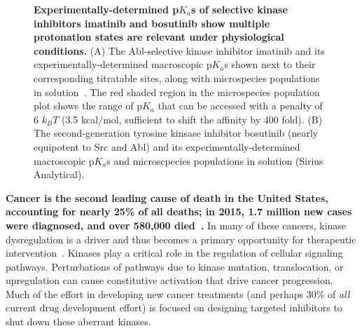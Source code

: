 \documentclass[11pt]{article}
\begin{document}
\begin{figure}[b]
\begin{centering}

\end{centering}
\vspace{-0.1in}
\caption{\footnotesize {\bf Experimentally-determined p$K_a$s of selective kinase inhibitors imatinib and bosutinib show multiple protonation states are relevant under physiological conditions.}
(A) The Abl-selective kinase inhibitor imatinib and its experimentally-determined macroscopic p$K_a$s shown next to their corresponding titratable sites, along with microspecies populations in solution~\cite{szakacks:j-med-chem:2005:acid-base-profiling-of-imatinib}.
The red shaded region in the microspecies population plot shows the range of p$K_a$ that can be accessed with a penalty of  6 $k_B T$ (3.5 kcal/mol, sufficient to shift the affinity by 400 fold).
(B) The second-generation tyrosine kinsase inhibitor bosutinib (nearly equipotent to Src and Abl) and its experimentally-determined macroscopic p$K_a$s and microscpecies populations in solution (Sirius Analytical).
\vspace{-0.1in}
\label{figure:kinase-inhibitor-experimental-pKas}}
\end{figure}

{\bf Cancer is the second leading cause of death in the United States, accounting for nearly 25\% of all deaths; in 2015, 1.7 million new cases were diagnosed, and over 580,000 died~\cite{acs-cancer-facts-2014}.}
In many of these cancers, kinase dysregulation is a driver and thus becomes a primary opportunity for therapeutic intervention~\cite{gray:nat-rev-cancer:2009:kinase-inhibitor-review}.
Kinases play a critical role in the regulation of cellular signaling pathways. Perturbations of pathways due to kinase mutation, translocation, or upregulation  can cause constitutive activation that drive cancer progression.
Much of the effort in developing new cancer treatments (and perhaps 30\% of \emph{all} current drug development effort) is focused on designing targeted inhibitors to shut down these aberrant kinases.
\end{document}
